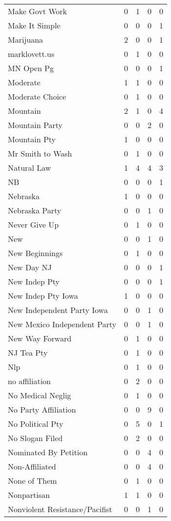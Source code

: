 \begin{supertabular}{lrrrr}
Make Govt Work & 0 & 1 & 0 & 0\\
Make It Simple & 0 & 0 & 0 & 1\\
Marijuana & 2 & 0 & 0 & 1\\
marklovett.us & 0 & 1 & 0 & 0\\
MN Open Pg & 0 & 0 & 0 & 1\\
Moderate & 1 & 1 & 0 & 0\\
Moderate Choice & 0 & 1 & 0 & 0\\
Mountain & 2 & 1 & 0 & 4\\
Mountain Party & 0 & 0 & 2 & 0\\
Mountain Pty & 1 & 0 & 0 & 0\\
Mr Smith to Wash & 0 & 1 & 0 & 0\\
Natural Law & 1 & 4 & 4 & 3\\
NB & 0 & 0 & 0 & 1\\
Nebraska & 1 & 0 & 0 & 0\\
Nebraska Party & 0 & 0 & 1 & 0\\
Never Give Up & 0 & 1 & 0 & 0\\
New & 0 & 0 & 1 & 0\\
New Beginnings & 0 & 1 & 0 & 0\\
New Day NJ & 0 & 0 & 0 & 1\\
New Indep Pty & 0 & 0 & 0 & 1\\
New Indep Pty Iowa & 1 & 0 & 0 & 0\\
New Independent Party Iowa & 0 & 0 & 1 & 0\\
New Mexico Independent Party & 0 & 0 & 1 & 0\\
New Way Forward & 0 & 1 & 0 & 0\\
NJ Tea Pty & 0 & 1 & 0 & 0\\
Nlp & 0 & 1 & 0 & 0\\
no  affiliation & 0 & 2 & 0 & 0\\
No Medical Neglig & 0 & 1 & 0 & 0\\
No Party Affiliation & 0 & 0 & 9 & 0\\
No Political Pty & 0 & 5 & 0 & 1\\
No Slogan Filed & 0 & 2 & 0 & 0\\
Nominated By Petition & 0 & 0 & 4 & 0\\
Non-Affiliated & 0 & 0 & 4 & 0\\
None of Them & 0 & 1 & 0 & 0\\
Nonpartisan & 1 & 1 & 0 & 0\\
Nonviolent Resistance/Pacifist & 0 & 0 & 1 & 0\\

\end{supertabular}
